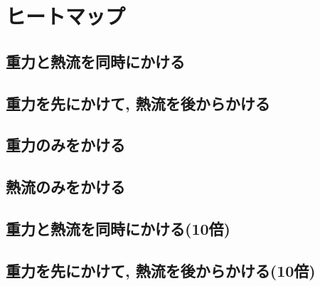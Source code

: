 


\section{ヒートマップ}

\subsection{重力と熱流を同時にかける}



\subsection{重力を先にかけて, 熱流を後からかける}



\subsection{重力のみをかける}



\subsection{熱流のみをかける}



\subsection{重力と熱流を同時にかける(10倍)}



\subsection{重力を先にかけて, 熱流を後からかける(10倍)}



